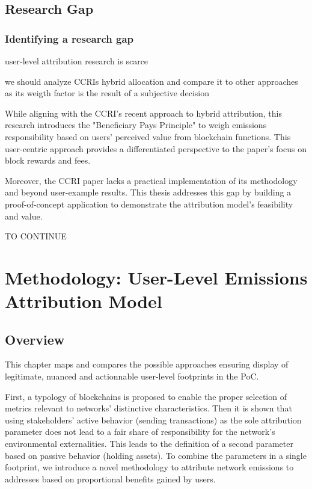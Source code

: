 \documentclass[11pt]{report}
\begin{document}
\section{Research Gap}

\subsection{Identifying a research gap}

user-level attribution research is scarce

we should analyze CCRIs hybrid allocation and compare it to other approaches as its weigth factor is the result of a subjective decision



While aligning with the CCRI's recent approach to hybrid attribution, this research introduces the "Beneficiary Pays Principle" to weigh emissions responsibility based on users' perceived value from blockchain functions. This user-centric approach provides a differentiated perspective to the paper's focus on block rewards and fees.

Moreover, the CCRI paper lacks a practical implementation of its methodology and beyond user-example results. This thesis addresses this gap by building a proof-of-concept application to demonstrate the attribution model's feasibility and value.

    {\large{TO CONTINUE}} 

\chapter{Methodology: User-Level Emissions Attribution Model}
\section{Overview \label{se:methodology_overview}}


This chapter maps and compares the possible approaches ensuring display of legitimate, nuanced and actionnable user-level footprints in the PoC.

First, a typology of blockchains is proposed to enable the proper selection of metrics relevant to networks' distinctive characteristics. Then it is shown that using stakeholders' active behavior (sending transactions) as the sole attribution parameter does not lead to a fair share of responsibility for the network's environmental externalities. This leads to the definition of a second parameter based on passive behavior (holding assets). To combine the parameters in a single footprint, we introduce a novel methodology to attribute network emissions to addresses based on proportional benefits gained by users.
\end{document}
